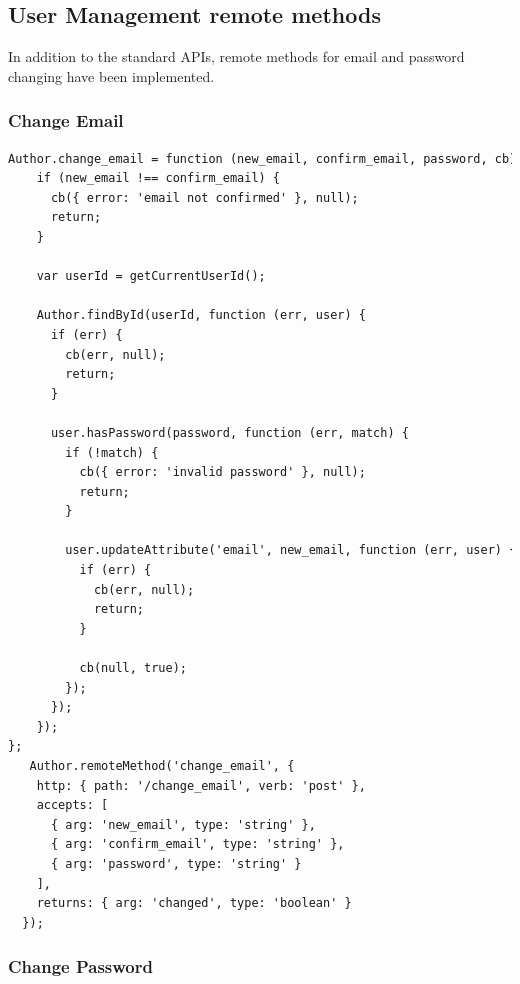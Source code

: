 \subsection{User Management remote methods}

In addition to the standard APIs, remote methods for email and password changing have been implemented. 

\subsubsection{Change Email}

\begin{lstlisting}[language=html]
Author.change_email = function (new_email, confirm_email, password, cb) {
    if (new_email !== confirm_email) {
      cb({ error: 'email not confirmed' }, null);
      return;
    }

    var userId = getCurrentUserId();  

    Author.findById(userId, function (err, user) {
      if (err) {
        cb(err, null);
        return;
      }

      user.hasPassword(password, function (err, match) {
        if (!match) {
          cb({ error: 'invalid password' }, null);
          return;
        }

        user.updateAttribute('email', new_email, function (err, user) {
          if (err) {
            cb(err, null);
            return;
          }

          cb(null, true);
        });
	  });       
	});
};
   Author.remoteMethod('change_email', {
    http: { path: '/change_email', verb: 'post' },
    accepts: [
      { arg: 'new_email', type: 'string' },
      { arg: 'confirm_email', type: 'string' },
      { arg: 'password', type: 'string' }
    ],
    returns: { arg: 'changed', type: 'boolean' }
  });
\end{lstlisting}

\subsubsection{Change Password}

